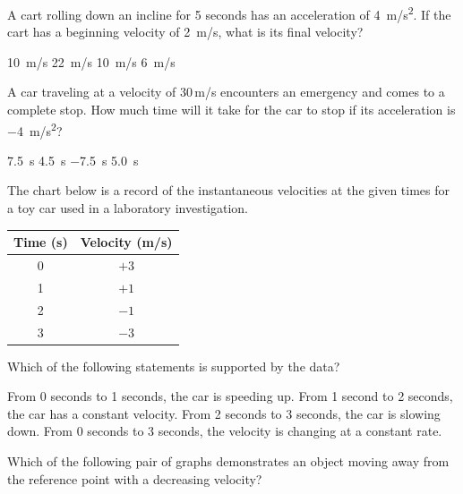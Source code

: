 \documentclass[]{exam}
\begin{document}
\begin{questions}


\question
A cart rolling down an incline for 5 seconds has an acceleration of \SI{4}{m/s^2}.  If the cart has a beginning velocity of \SI{2}{m/s}, what is its final velocity?

\begin{randomizechoices}
    \choice \SI{10}{m/s}
    \correctchoice \SI{22}{m/s}
    \choice \SI{10}{m/s}
    \choice \SI{6}{m/s}
\end{randomizechoices}

\question
A car traveling at a velocity of 30\,m/s encounters an emergency and comes to a complete stop.  How much time will it take for the car to stop if its acceleration is \SI{-4}{m/s^2}?

\begin{randomizechoices}
    \correctchoice \SI{7.5}{s}
    \choice \SI{4.5}{s}
    \choice \SI{-7.5}{s}
    \choice \SI{5.0}{s}
\end{randomizechoices}

\question
The chart below is a record of the instantaneous velocities at the given times for a toy car used in a laboratory investigation.

\begin{center}
    \begin{tabular}{c|c}
        \textbf{Time} (s) & \textbf{Velocity} (m/s) \\ \hline
        0 & $+3$ \\
        1 & $+1$ \\
        2 & $-1$ \\
        3 & $-3$ \\
    \end{tabular}
\end{center}

Which of the following statements is supported by the data?

\begin{randomizechoices}
    \choice From 0 seconds to 1 seconds, the car is speeding up.
    \choice From 1 second to 2 seconds, the car has a constant velocity. 
    \choice From 2 seconds to 3 seconds, the car is slowing down.
    \correctchoice From 0 seconds to 3 seconds, the velocity is changing at a constant rate.
\end{randomizechoices}

\question
Which of the following pair of graphs demonstrates an object moving away from the reference point with a decreasing velocity?


\end{questions}
\end{document}
